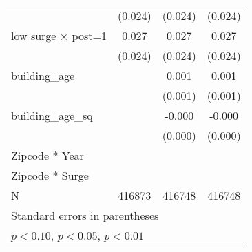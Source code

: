 {\begin{tabular}{l*{3}{c}}
                    &     (0.024)         &     (0.024)         &     (0.024)         \\
\addlinespace
low surge $\times$ post=1&       0.027         &       0.027         &       0.027         \\
                    &     (0.024)         &     (0.024)         &     (0.024)         \\
\addlinespace
building\_age        &                     &       0.001         &       0.001         \\
                    &                     &     (0.001)         &     (0.001)         \\
\addlinespace
building\_age\_sq     &                     &      -0.000         &      -0.000         \\
                    &                     &     (0.000)         &     (0.000)         \\
\midrule
Zipcode * Year      &                     &                     &                     \\
Zipcode * Surge     &                     &                     &                     \\
N                   &      416873         &      416748         &      416748         \\
\bottomrule
\multicolumn{4}{l}{\footnotesize Standard errors in parentheses}\\
\multicolumn{4}{l}{\footnotesize \sym{*} \(p<0.10\), \sym{**} \(p<0.05\), \sym{***} \(p<0.01\)}\\
\end{tabular}
}

